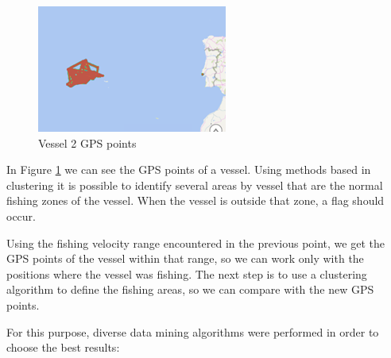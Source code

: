 \begin{figure}[H]
    \centering
    \includegraphics[width=0.8\linewidth]{Chapters/img/gps_vessel2.png}
    \caption{Vessel 2 GPS points}
    \label{fig:gps_vessel2}
\end{figure}

In Figure \ref{fig:gps_vessel2} we can see the GPS points of a vessel. Using methods based in clustering it is possible to identify several areas by vessel that are the normal fishing zones of the vessel. When the vessel is outside that zone, a flag should occur.

Using the fishing velocity range encountered in the previous point, we get the GPS points of the vessel within that range, so we can work only with the positions where the vessel was fishing. The next step is to use a clustering algorithm to define the fishing areas, so we can compare with the new GPS points. 

For this purpose, diverse data mining algorithms were performed in order to choose the best results:

